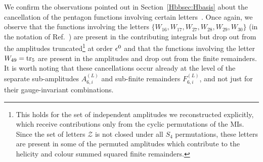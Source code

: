 \documentclass[main.tex]{subfiles}
\begin{document}
We confirm the observations pointed out in Section~\ref{Hbbsec:Hbasis} about the cancellation of the pentagon functions involving certain letters~\cite{Badger:2021nhg, Badger:2021ega, Abreu:2021asb}. Once again, we observe that the functions involving the letters $\{W_{16}, W_{17}, W_{27}, W_{28}, W_{29}, W_{30} \}$ (in the notation of Ref.~\cite{Abreu:2020jxa}) are present in the contributing integrals but drop out from the amplitudes truncated\footnote{This holds for the set of independent amplitudes we reconstructed explicitly, which receive contributions only from the cyclic permutations of the MIs. Since the set of letters $\mathcal{Z}$ is not closed under all $S_4$ permutations, these letters are present in some of the permuted amplitudes which contribute to the helicity and colour summed squared finite remainders.} at order $\epsilon^0$ and that the functions involving the letter $W_{49}=\operatorname{\rm tr}_5$ are present in the amplitudes and drop out from the finite remainders. It is worth noting that these cancellations occur already at the level of the separate sub-amplitudes $A^{(L)}_{6,i}$ and sub-finite remainders $F^{(L)}_{6,i}$, and not just for their gauge-invariant combinations. 
\end{document}
